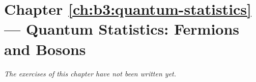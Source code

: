 \section*{Chapter \ref{ch:b3:quantum-statistics} --- Quantum Statistics: Fermions and Bosons}


\emph{The exercises of this chapter have not been written yet.}
